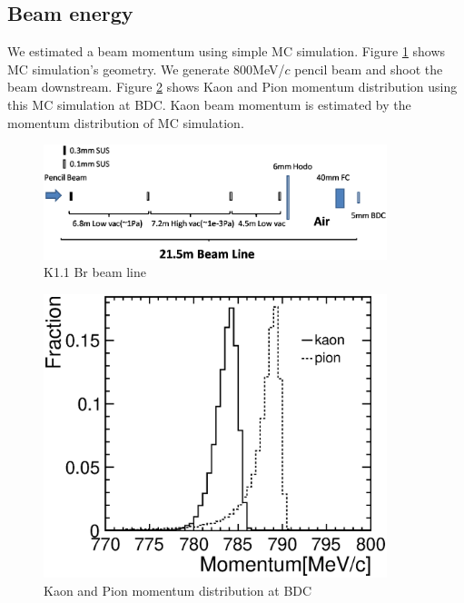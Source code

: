 \subsection{Beam energy}
We estimated a beam momentum using simple MC simulation.
Figure \ref{K11Br_Beam_line} shows MC simulation's geometry.
We generate 800MeV/$c$ pencil beam and shoot the beam downstream.
Figure \ref{k_pi_momentum} shows Kaon and Pion momentum distribution
using this MC simulation at BDC.
Kaon beam momentum is estimated by the momentum distribution of MC simulation.

\begin{figure}[!htb]
  \centering
  \centering
  \includegraphics[width=10cm,clip]{./fig/K11Br_beamline_sim.eps}
  \caption{K1.1 Br beam line}
  \label{K11Br_Beam_line}
\end{figure}


\begin{figure}[!htb]
  \centering
  \centering
  \includegraphics[width=10cm,clip]{./fig/Kaon_pion_momentum_nogrid.eps}
  \caption{Kaon and Pion momentum distribution at BDC}
  \label{k_pi_momentum}
\end{figure}


